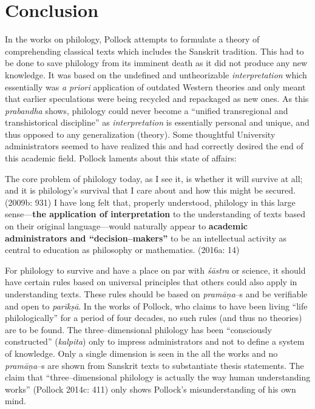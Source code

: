 
\chapter{Conclusion}\label{chapter5}

In the works on philology, Pollock attempts to formulate a theory of comprehending classical texts which includes the Sanskrit tradition. This had to be done to save philology from its imminent death as it did not produce any new knowledge. It was based on the undefined and untheorizable \textit{interpretation} which essentially was \textit{a priori} application of outdated Western theories and only meant that earlier speculations were being recycled and repackaged as new ones. As this \textit{prabandha} shows, philology could never become a “unified transregional and transhistorical discipline” as \textit{interpretation} is essentially personal and unique, and thus opposed to any generalization (theory). Some thoughtful University administrators seemed to have realized this and had correctly desired the end of this academic field. Pollock laments about this state of affairs:

\begin{myquote}
The core problem of philology today, as I see it, is whether it will survive at all; and it is philology’s survival that I care about and how this might be secured. (2009b: 931) I have long felt that, properly understood, philology in this large sense—\textbf{the application of interpretation }to the understanding of texts based on their original language—would naturally appear to \textbf{academic administrators and “decision–makers”} to be an intellectual activity as central to education as philosophy or mathematics. (2016a: 14)
\end{myquote}

For philology to survive and have a place on par with \textit{śāstra} or science, it should have certain rules based on universal principles that others could also apply in understanding texts. These rules should be based on \textit{pramāṇa}–s and be verifiable and open to \textit{parīkṣā}. In the works of Pollock, who claims to have been living “life philologically” for a period of four decades, no such rules (and thus no theories) are to be found. The three–dimensional philology has been “consciously constructed” (\textit{kalpita}) only to impress administrators and not to define a system of knowledge. Only a single dimension is seen in the all the works and no \textit{pramāṇa}–s are shown from Sanskrit texts to substantiate thesis statements. The claim that “three–dimensional philology is actually the way human understanding works” (Pollock 2014c: 411) only shows Pollock’s misunderstanding of his own mind.

